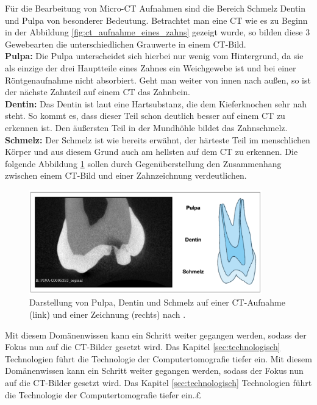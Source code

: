 Für die Bearbeitung von Micro-CT Aufnahmen sind die Bereich Schmelz Dentin und Pulpa
von besonderer Bedeutung. Betrachtet man eine CT wie es zu Beginn in der
Abbildung \ref{fig:ct_aufnahme_eines_zahns} gezeigt wurde, so bilden diese 3 Gewebearten
die unterschiedlichen Grauwerte in einem CT-Bild. \\ \textbf{Pulpa:} Die Pulpa unterscheidet
sich hierbei nur wenig vom Hintergrund, da sie als einzige der drei Hauptteile
eines Zahnes ein Weichgewebe ist und bei einer Röntgenaufnahme nicht absorbiert.
Geht man weiter von innen nach außen, so ist der nächste Zahnteil auf einem CT
das Zahnbein. \\ \textbf{Dentin:} Das Dentin ist laut \citet[Seite 41]{lehmann2012Zahnheilkunde}
eine Hartsubstanz, die dem Kieferknochen sehr nah steht. So kommt es, dass dieser
Teil schon deutlich besser auf einem CT zu erkennen ist. Den äußersten Teil in
der Mundhöhle bildet das Zahnschmelz. \\ \textbf{Schmelz:} Der Schmelz ist wie
bereits erwähnt, der härteste Teil im menschlichen Körper und aus diesem Grund auch
am hellsten auf dem CT zu erkennen. Die folgende Abbildung
\ref{fig:pulpa_dentin_schmelz} sollen durch Gegenüberstellung den Zusammenhang
zwischen einem CT-Bild und einer Zahnzeichnung verdeutlichen.

\begin{figure}[h]
	\centering
	\includegraphics[width=0.9\textwidth]{
		img/Bildschirmfoto 2024-11-22 um 15.13.24.jpg
	}
	\caption{Darstellung von Pulpa, Dentin und Schmelz auf einer CT-Aufnahme (link)
	und einer Zeichnung (rechts) nach \citet[Seite 29]{lehmann2012Zahnheilkunde}. }
	\label{fig:pulpa_dentin_schmelz}
\end{figure}

Mit diesem Domänenwissen kann ein Schritt weiter gegangen werden, sodass der
Fokus nun auf die CT-Bilder gesetzt wird. Das Kapitel \ref{sec:technologisch} Technologien
führt die Technologie der Computertomografie tiefer ein. Mit diesem
Domänenwissen kann ein Schritt weiter gegangen werden, sodass der Fokus nun auf die
CT-Bilder gesetzt wird. Das Kapitel \ref{sec:technologisch} Technologien führt
die Technologie der Computertomografie tiefer ein.£

